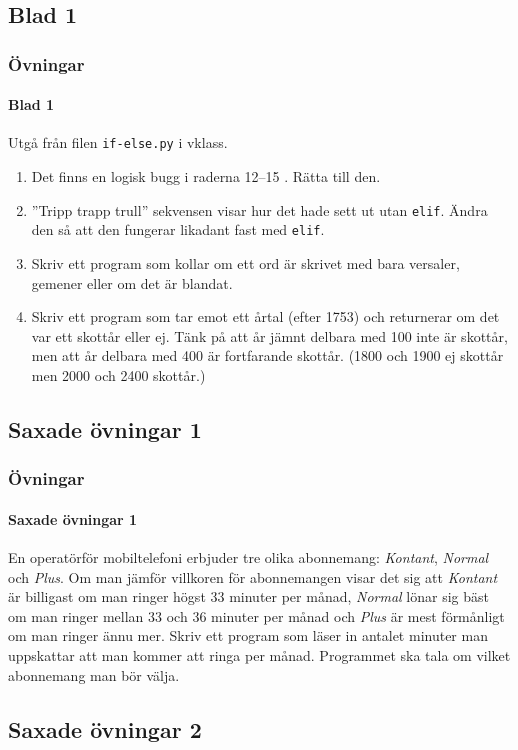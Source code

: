 \documentclass{beamer}
\begin{document}
\subsection{Blad 1}

\begin{frame}
	\frametitle{Övningar}
	\framesubtitle{Blad 1}

Utgå från filen \texttt{if-else.py} i vklass.

\begin{enumerate}
\item Det finns en logisk bugg i raderna 12--15	. Rätta till den.
\item ''Tripp trapp trull'' sekvensen visar hur det hade sett ut utan \texttt{elif}. Ändra den så att den fungerar likadant fast med \texttt{elif}.
\item Skriv ett program som kollar om ett ord är skrivet med bara versaler, gemener eller om det är blandat.
\item Skriv ett program som tar emot ett årtal (efter 1753) och returnerar om det var ett skottår eller ej. Tänk på att år jämnt delbara med 100 inte är skottår, men att år delbara med 400 är fortfarande skottår. (1800 och 1900 ej skottår men 2000 och 2400 skottår.)
\end{enumerate}

\end{frame}

\subsection{Saxade övningar 1}

\begin{frame}
	\frametitle{Övningar}
	\framesubtitle{Saxade övningar 1}
	
	En operatörför mobiltelefoni erbjuder tre olika abonnemang: \textit{Kontant}, \textit{Normal} och \textit{Plus}. Om man jämför villkoren för abonnemangen visar det sig att \textit{Kontant} är billigast om man ringer högst 33 minuter per månad, \textit{Normal} lönar sig bäst om man ringer mellan 33 och 36 minuter per månad och \textit{Plus} är mest förmånligt om man ringer ännu mer. Skriv ett program som läser in antalet minuter man uppskattar att man kommer att ringa per månad. Programmet ska tala om vilket abonnemang man bör välja.
	
\end{frame}

\subsection{Saxade övningar 2}
\end{document}
